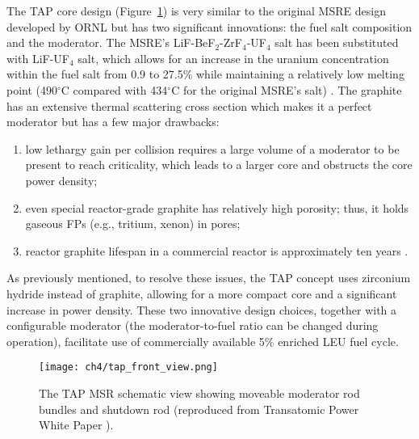 The \gls{TAP} core design (Figure~\ref{fig:tap-side-view}) is very similar to 
the
original \gls{MSRE} design developed by \gls{ORNL} 
\cite{haubenreich_experience_1970} but has two significant innovations: 
the fuel salt composition and the moderator. The \gls{MSRE}'s 
LiF-BeF$_2$-ZrF$_4$-UF$_4$ salt has been substituted with LiF-UF$_4$ salt, 
which allows for an increase in the uranium concentration within the fuel salt 
from 0.9 to 27.5\% while maintaining a relatively low melting point 
(490$^{\circ}$C compared with 434$^{\circ}$C for the original \gls{MSRE}'s 
salt) \cite{betzler_two-dimensional_2017}. The graphite has an extensive 
thermal scattering cross section which makes it a perfect moderator but has 
a few major drawbacks: 
\begin{enumerate}[label=(\alph*), noitemsep, topsep=0pt]
	\item low lethargy gain per collision requires a large volume of a
	moderator to be present to reach criticality, which leads to a larger core 
	and obstructs the core power density;
	\item even special reactor-grade graphite has relatively high porosity; 
	thus, it holds gaseous \glspl{FP} (e.g., tritium, xenon) in pores;
	\item reactor graphite lifespan in a commercial reactor is 
	approximately ten years \cite{robertson_conceptual_1971}.
\end{enumerate}
As previously mentioned, to resolve these issues, the \gls{TAP} concept uses 
zirconium hydride instead of graphite, allowing for a more compact core and a 
significant increase in power density. These two innovative design choices, 
together with a configurable moderator (the moderator-to-fuel ratio can be 
changed during operation), facilitate use of commercially available 5\% 
enriched \gls{LEU} fuel cycle. 
\begin{figure}[h] %
	\hspace{+2.2in}
	\texttt{[image: ch4/tap\_front\_view.png]}
	\caption{The \gls{TAP} \gls{MSR} schematic view showing moveable moderator 
		rod bundles and shutdown rod (reproduced from Transatomic Power 
		White Paper \cite{transatomic_power_corporation_technical_2016}).}
	\label{fig:tap-side-view}
\end{figure}

